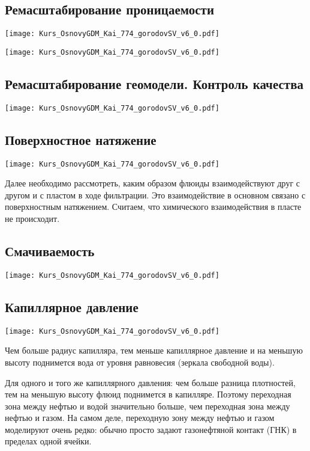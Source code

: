 \documentclass[main.tex]{subfiles}
\begin{document}
\subsection{Ремасштабирование проницаемости}

\texttt{[image: Kurs\_OsnovyGDM\_Kai\_774\_gorodovSV\_v6\_0.pdf]}

\texttt{[image: Kurs\_OsnovyGDM\_Kai\_774\_gorodovSV\_v6\_0.pdf]}

\subsection{Ремасштабирование геомодели. Контроль качества}

\texttt{[image: Kurs\_OsnovyGDM\_Kai\_774\_gorodovSV\_v6\_0.pdf]}

\subsection{Поверхностное натяжение}

\texttt{[image: Kurs\_OsnovyGDM\_Kai\_774\_gorodovSV\_v6\_0.pdf]}

Далее необходимо рассмотреть, каким образом флюиды взаимодействуют друг с другом и с пластом в ходе фильтрации. Это взаимодействие в основном связано с поверхностным натяжением. Считаем, что химического взаимодействия в пласте не происходит.

\subsection{Смачиваемость}

\texttt{[image: Kurs\_OsnovyGDM\_Kai\_774\_gorodovSV\_v6\_0.pdf]}

\subsection{Капиллярное давление}

\texttt{[image: Kurs\_OsnovyGDM\_Kai\_774\_gorodovSV\_v6\_0.pdf]}

Чем больше радиус капилляра, тем меньше капиллярное давление и на меньшую высоту поднимется вода от уровня равновесия (зеркала свободной воды).

Для одного и того же капиллярного давления: чем больше разница плотностей, тем на меньшую высоту флюид поднимется в капилляре.
Поэтому переходная зона между нефтью и водой значительно больше, чем переходная зона между нефтью и газом.
На самом деле, переходную зону между нефтью и газом моделируют очень редко: обычно просто задают газонефтяной контакт (ГНК) в пределах одной ячейки.
\end{document}

